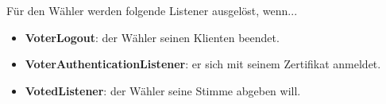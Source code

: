 \documentclass[parskip=full]{scrartcl}
\newcommand{\fakeparagraph}[1]{\textbf{#1}}
\begin{document}
	Für den Wähler werden folgende Listener ausgelöst, wenn...
	\begin{itemize}
		\item\fakeparagraph{VoterLogout}: der Wähler seinen Klienten beendet.
		\item\fakeparagraph{VoterAuthenticationListener}: er sich mit seinem Zertifikat anmeldet.
		\item\fakeparagraph{VotedListener}: der Wähler seine Stimme abgeben will.
	\end{itemize}
\end{document}
